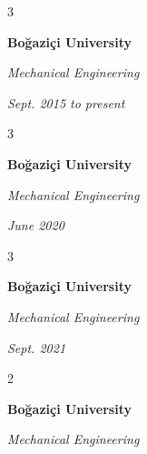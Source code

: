 \documentclass[10pt, letterpaper]{article}
\newenvironment{onecolentrybulleted}{
    \onecolentry
    \setcolumnwidth{0.6 cm, \fill}
    \begin{paracol}{2}
    \vspace*{\fill}
    \textbullet
    \vspace*{3px}
    \vspace*{\fill}
    \switchcolumn
}{
    \end{paracol}
    \endonecolentry
} %
\newenvironment{threecolentry}[3][]{
    \onecolentry
    \def\thirdColumn{#3}
    \setcolumnwidth{0.6 cm, \fill, 4.5 cm}
    \begin{paracol}{3}
    #2 \switchcolumn
}{
    \switchcolumn \raggedleft \thirdColumn
    \end{paracol}
    \endonecolentry
} %
\begin{document}
        \vspace{0.2 cm-3px}

        \begin{threecolentry}{
            \vspace*{\fill}
            \textbullet
            \vspace*{3px}
            \vspace*{\fill}
        }{
            
            
        \textit{Sept. 2015 to present}}
            \textbf{Boğaziçi University}

            \textit{Mechanical Engineering}
        \end{threecolentry}



        \vspace{0.2 cm-3px}

        \begin{threecolentry}{
            \vspace*{\fill}
            \textbullet
            \vspace*{3px}
            \vspace*{\fill}
        }{
            
            
        \textit{June 2020}}
            \textbf{Boğaziçi University}

            \textit{Mechanical Engineering}
        \end{threecolentry}



        \vspace{0.2 cm-3px}

        \begin{threecolentry}{
            \vspace*{\fill}
            \textbullet
            \vspace*{3px}
            \vspace*{\fill}
        }{
            
            
        \textit{Sept. 2021}}
            \textbf{Boğaziçi University}

            \textit{Mechanical Engineering}
        \end{threecolentry}



        \vspace{0.2 cm-3px}

        \begin{onecolentrybulleted}
            \textbf{Boğaziçi University}

            \textit{Mechanical Engineering}
        \end{onecolentrybulleted}
\end{document}
